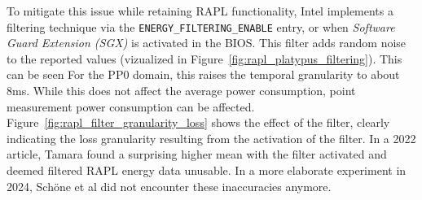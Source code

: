 \begin{itemize}
    To mitigate this issue while retaining RAPL functionality, Intel implements a filtering technique via the \texttt{ENERGY\_FILTERING\_ENABLE}\parencite[Table 2-2]{intel2023} entry, or when \textit{Software Guard Extension (SGX)} is activated in the BIOS. This filter adds random noise to the reported values (vizualized in Figure~\ref{fig:rapl_platypus_filtering}). This can be seen For the PP0 domain, this raises the temporal granularity to about 8ms. While this does not affect the average power consumption, point measurement power consumption can be affected. Figure~\ref{fig:rapl_filter_granularity_loss} shows the effect of the filter, clearly indicating the loss granularity resulting from the activation of the filter. In a 2022 article, Tamara\parencite{greencoding_rapl_sgx} found a surprising higher mean with the filter activated and deemed filtered RAPL energy data unusable. In a more elaborate experiment in 2024, Schöne et al did not encounter these inaccuracies anymore.


\end{itemize}
